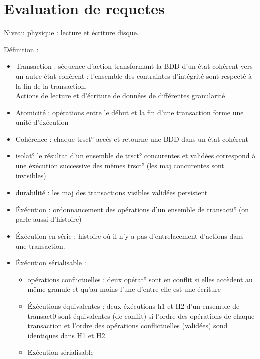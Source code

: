{\section{Evaluation de requetes}

Niveau physique : lecture et écriture disque.

Définition :
\begin{itemize}
	\item Transaction : séquence d'action transformant la BDD d'un état cohérent vers un autre état cohérent : l'ensemble des contraintes d'intégrité sont respecté à la fin de la transaction.\\ Actions de lecture et d'écriture de données de différentes granularité
	\item Atomicité : opérations entre le début et la fin d'une transaction forme une unité d'éxécution
	\item Cohérence : chaque trsct° accès et retourne une BDD dans un état cohérent
	\item isolat° le résultat d'un ensemble de trsct° concurentes et validées correspond à une éxécution successive des mêmes trsct° (les maj concurentes sont invisibles)
	\item durabilité : les maj des transactions visibles validées persistent
\end{itemize}

\begin{itemize}
	\item Éxécution : ordonnancement des opérations d'un ensemble de transacti° (on parle aussi d'histoire)
	\item Éxécution en série : histoire où il n'y a pas d'entrelacement d'actions dans une transaction.
	\item Éxécution sérialisable : \\
		\begin{itemize}
			\item opérations conflictuelles : deux opérat° sont en conflit si elles accèdent au même granule et qu'au moins l'une d'entre elle est une écriture
			\item Éxécutions équivalentes : deux éxécutions h1 et H2 d'un ensemble de transact0 sont équivalentes (de conflit) si l'ordre des opérations de chaque transaction et l'ordre des opérations conflictuelles (validées) sond identiques dans H1 et H2.
			\item Exécution sérialisable 
		\end{itemize}

\end{itemize}

}
